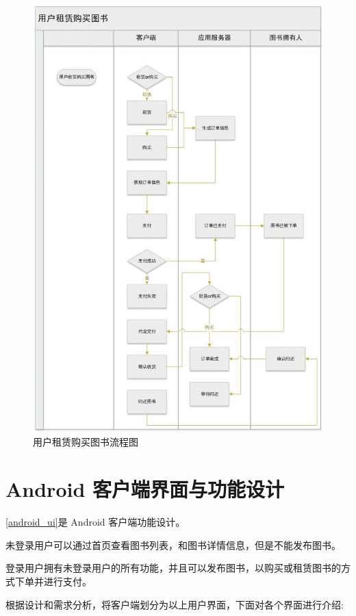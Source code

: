 \begin{figure}[p]
	\centering
	\includegraphics[scale=0.75]{Chapters/UML/user_rent_or_buy.jpg}
	\caption{用户租赁购买图书流程图}
	\label{user_rent_or_buy}
\end{figure}

\section{ Android 客户端界面与功能设计}
\cref{android_ui}是 Android 客户端功能设计。

未登录用户可以通过首页查看图书列表，和图书详情信息，但是不能发布图书。

登录用户拥有未登录用户的所有功能，并且可以发布图书，以购买或租赁图书的方式下单并进行支付。

根据设计和需求分析，将客户端划分为以上用户界面，下面对各个界面进行介绍:

